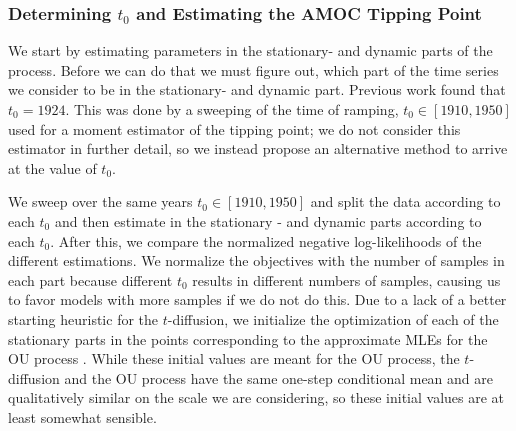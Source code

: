 \subsubsection{Determining \texorpdfstring{$t_0$}{t0} and Estimating the AMOC Tipping Point}
We start by estimating parameters in the stationary- and dynamic parts of the process. Before we can do that we must figure out, which part of the time series we consider to be in the stationary- and dynamic part. Previous work found that $t_0 = 1924$. This was done by a sweeping of the time of ramping, $t_0 \in [1910, 1950]$ used for a moment estimator of the tipping point; we do not consider this estimator in further detail, so we instead propose an alternative method to arrive at the value of $t_0$.

We sweep over the same years $t_0 \in [1910, 1950]$ and split the data according to each $t_0$ and then estimate in the stationary - and dynamic parts according to each $t_0$. After this, we compare the normalized negative log-likelihoods of the different estimations. We normalize the objectives with the number of samples in each part because different $t_0$ results in different numbers of samples, causing us to favor models with more samples if we do not do this. Due to a lack of a better starting heuristic for the $t$-diffusion, we initialize the optimization of each of the stationary parts in the points corresponding to the approximate MLEs for the OU process \cite[equation (S4-S6)]{DitlevsenSupplementary}. While these initial values are meant for the OU process, the $t$-diffusion and the OU process have the same one-step conditional mean and are qualitatively similar on the scale we are considering, so these initial values are at least somewhat sensible.

